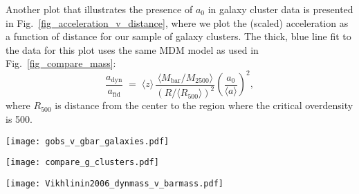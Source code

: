 \documentclass{bjp}
\newcommand{\ac}{\bar{a}_0}
\newcommand{\vev}[1]{\langle #1 \rangle}
\begin{document}
Another plot that illustrates the presence of $a_0$ in galaxy cluster data is presented in Fig.~\ref{fig_acceleration_v_distance}, where we plot the (scaled) acceleration as a function of distance for our sample of galaxy clusters. The thick, blue line fit to the data for this plot uses the same MDM model as used in Fig.~\ref{fig_compare_mass}:
%
\begin{equation}
\frac{a_\mathrm{dyn}}{a_\mathrm{fid}} 
\;=\; \vev{z}\,  
\frac{ \vev{M_\mathrm{bar} / M_{2500}} }{ \left( R/ \vev{R_{500}} \right)^2 }  
\left( \frac{a_0}{\vev{a}} \right)^2 ,
\end{equation}
where $R_{500}$ is distance from the center to the region where the critical overdensity is 500.

\begin{figure*}
  \texttt{[image: gobs\_v\_gbar\_galaxies.pdf]}
  \caption{Comparison of observed accelerations and accelerations expected from baryons in galaxies. The black squares are 386 data points from a sample of 30 galaxies presented in this paper. The black line is what we expect from Newtonian physics and no dark matter. The red line is the prediction of Eq.~\ref{modified_McGaughRelation}.}
  \label{fig_compare_g_galaxies}
\end{figure*}

\begin{figure*}
  \texttt{[image: compare\_g\_clusters.pdf]}
  \caption{Comparison of observed accelerations and accelerations expected from baryons in galaxy clusters. The black squares represent fits to data from a sample of 13 galaxy clusters\cite{Vikhlinin:2005mp}. The solid and dashed red lines are the predictions of Eq.~\ref{modified_McGaughRelation} using $a_0$ and $\ac$, respectively.}
  \label{fig_compare_g_clusters}
\end{figure*}

\begin{figure*}
  \texttt{[image: Vikhlinin2006\_dynmass\_v\_barmass.pdf]}
  \caption{The solid gray lines represent the 12 galaxy clusters for which $M_{2500}$ was available. The dashed gray line is the expected relationship between dynamical and baryonic mass for Newtonian gravity and no DM. The solid blue line is the relationship expected for MDM.}
  \label{fig_compare_mass}
\end{figure*}
\end{document}
